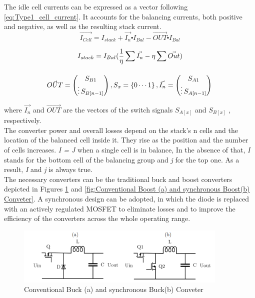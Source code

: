 The idle cell currents can be expressed as a vector following \ref{eq:Type1_cell_current}. It accounts for the balancing currents, both positive and negative, as well as the resulting stack current.
\begin{equation}\label{eq:Type1_cell_current}
    \vec{I_{Cell}}  = I_{stack} + \vec{I_n}\centerdot I_{Bal} - \vec{OUT}\centerdot I_{Bal}
\end{equation}

\begin{equation}\label{eq:Type1_cell_current}
    I_{stack}  = I_{Bal}(\frac{1}{\eta } \sum_{}^{}\vec{I_n}  - \eta\sum \vec{Out} ) \\
\end{equation}

\begin{equation}
\vec{OUT}  = \begin{pmatrix}
    S_{B1}\\
    \vdots
    S_{B[n-1]}  
\end{pmatrix} \\
, S_{x}=\left\{0\cdots1\right\}\\
, \vec{I_n}  = \begin{pmatrix}
    S_{A1}\\
    \vdots
    S_{A[n-1]}
\end{pmatrix} \\
\end{equation}

where $\vec{I_n}$ and $\vec{OUT}$ are the vectors of the switch signals $S_{A[x]}$ and $S_{B[x]}$ , respectively.
\\
The converter power and overall losses depend on the stack's n cells and the location of the balanced cell inside it. They rise as the position and the number of cells increases. \textit{I = J} when a single cell is in balance, In the absence of that, \textit{I} stands for the bottom cell of the balancing group and \textit{j} for the top one. As a result, \textit{I} and \textit{j} is always true.
\\
The necessary converters can be the traditional buck and boost converters depicted in Figures \ref{fig:Conventional Buck (a) and synchronous Buck(b) Conveter} and \ref{fig:Conventional Boost (a) and synchronous Boost(b) Conveter}. A synchronous design can be adopted, in which the diode is replaced with an actively regulated MOSFET to eliminate losses and to improve the efficiency of the converters across the whole operating range.
\begin{figure}[h]
	\centering
	\includegraphics[width=0.9\textwidth]{Chap04/Figures/Conventiaonal_buck_synch_buck.PNG}
	\caption{Conventional Buck (a) and synchronous Buck(b) Conveter} 
	\label{fig:Conventional Buck (a) and synchronous Buck(b) Conveter}
\end{figure}

